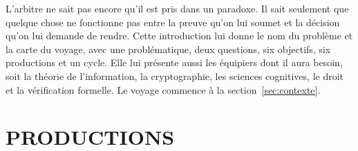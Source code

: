 \begin{boiteArbitre}
L'arbitre ne sait pas encore qu'il est pris dans un paradoxe.
Il sait seulement que quelque chose ne fonctionne pas entre la preuve qu'on
lui soumet et la d\'ecision qu'on lui demande de rendre. Cette introduction lui donne
le nom du probl\`eme et la carte du voyage, avec une probl\'ematique, deux questions, six
objectifs, six productions et un cycle. Elle lui pr\'esente aussi les \'equipiers dont il aura
besoin, soit la th\'eorie de l'information, la cryptographie, les
sciences cognitives, le droit et la v\'erification formelle. Le voyage commence
\`a la section~\ref{sec:contexte}.
\end{boiteArbitre}

\section{PRODUCTIONS}
\label{sec:ig_contributions}

